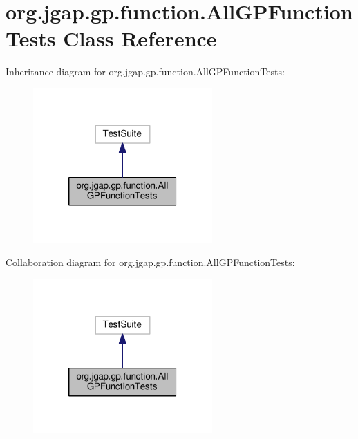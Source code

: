 \hypertarget{classorg_1_1jgap_1_1gp_1_1function_1_1_all_g_p_function_tests}{\section{org.\-jgap.\-gp.\-function.\-All\-G\-P\-Function\-Tests Class Reference}
\label{classorg_1_1jgap_1_1gp_1_1function_1_1_all_g_p_function_tests}
}


Inheritance diagram for org.\-jgap.\-gp.\-function.\-All\-G\-P\-Function\-Tests\-:
\nopagebreak
\begin{figure}[H]
\begin{center}
\leavevmode
\includegraphics[width=194pt]{classorg_1_1jgap_1_1gp_1_1function_1_1_all_g_p_function_tests__inherit__graph}
\end{center}
\end{figure}


Collaboration diagram for org.\-jgap.\-gp.\-function.\-All\-G\-P\-Function\-Tests\-:
\nopagebreak
\begin{figure}[H]
\begin{center}
\leavevmode
\includegraphics[width=194pt]{classorg_1_1jgap_1_1gp_1_1function_1_1_all_g_p_function_tests__coll__graph}
\end{center}
\end{figure}
